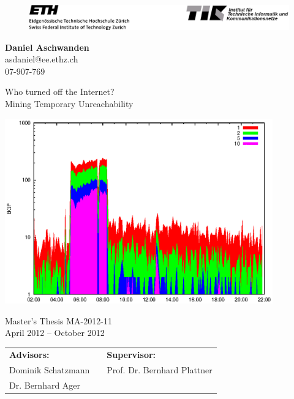 

\begin{titlepage}
	\begin{center}
		\begin{figure}
			[!t] 
			\includegraphics[width=
			\textwidth]{images/TIKETHhdr.eps} 
		\end{figure}
	\end{center}
	
	\vspace{2mm} \textbf{Daniel Aschwanden}\\
	asdaniel@ee.ethz.ch\\
	07-907-769
	\vspace{2mm}
	
	{\Huge 
	\begin{flushleft}
		Who turned off the Internet?\\
		\LARGE Mining Temporary
		Unreachability 
	\end{flushleft}
	} \vspace{3mm} \centering
	\includegraphics[height=8cm]{images/events/2010_03_25/bgp_log_Set_var_0_1_stab_9_vts_2.eps}
	\vspace{3mm}
	
	Master's Thesis MA-2012-11\\
	April 2012 -- October 2012\\
	
	\vspace{5mm} 
	\begin{tabular}
		{l p{} l} \textbf{Advisors:} &&
		\textbf{Supervisor:} \\
		Dominik Schatzmann && Prof. Dr. Bernhard Plattner\\
		Dr. Bernhard Ager && \\
	\end{tabular}
	

\end{titlepage}
